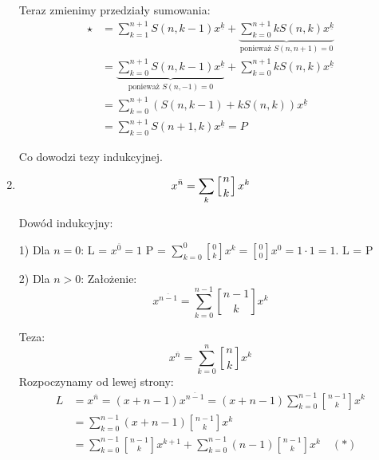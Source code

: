 \documentclass{mwart}
\begin{document}
\begin{mdframed}
\begin{enumerate}
              Teraz zmienimy przedziały sumowania:
              \begin{align*}
                  \star & = \sum_{k=1}^{n+1} S(n,k-1) x^{\underline{k}} + \underbrace{\sum_{k=0}^{n+1} k S(n,k) x^{\underline{k}}}_{\text{ponieważ } S(n,n+1)=0} \\
                        & = \underbrace{\sum_{k=0}^{n+1} S(n,k-1) x^{\underline{k}}}_{\text{ponieważ } S(n,-1)=0} + \sum_{k=0}^{n+1} k S(n,k) x^{\underline{k}}  \\
                        & = \sum_{k=0}^{n+1} (S(n,k-1) + k S(n,k)) x^{\underline{k}}                                                                             \\
                        & = \sum_{k=0}^{n+1} S(n+1,k) x^{\underline{k}} = P
              \end{align*}

              Co dowodzi tezy indukcyjnej.
              \newline

        \item $$x^{\bar{n}} = \sum_{k} \left[n \atop k \right] x^k$$

              Dowód indukcyjny:

              1) Dla $n=0$:
              \newline
              L = $x^{\overline{0}} = 1$
              \newline
              P = $\sum_{k=0}^0 \genfrac{[}{]}{0pt}{1}{0}{k} x^k = \genfrac{[}{]}{0pt}{1}{0}{0} x^0 = 1 \cdot 1 = 1$.
              \newline
              L = P
              \newline

              2) Dla $n>0$:
              \newline
              Założenie:
              $$x^{\overline{n-1}} = \sum_{k=0}^{n-1} \genfrac{[}{]}{0pt}{1}{n-1}{k} x^k$$

              Teza:
              $$x^{\overline{n}} = \sum_{k=0}^n \genfrac{[}{]}{0pt}{1}{n}{k} x^k$$
              Rozpoczynamy od lewej strony:
              \begin{align*}
                  L & = x^{\overline{n}} = (x+n-1) x^{\overline{n-1}} = (x+n-1) \sum_{k=0}^{n-1} \genfrac{[}{]}{0pt}{1}{n-1}{k} x^k                   \\
                    & = \sum_{k=0}^{n-1} (x+n-1) \genfrac{[}{]}{0pt}{1}{n-1}{k} x^k                                                                   \\
                    & = \sum_{k=0}^{n-1} \genfrac{[}{]}{0pt}{1}{n-1}{k} x^{k+1} + \sum_{k=0}^{n-1} (n-1) \genfrac{[}{]}{0pt}{1}{n-1}{k} x^k \quad (*)
              \end{align*}


\end{enumerate}
\end{mdframed}
\end{document}
